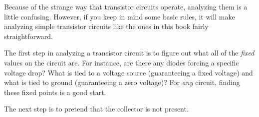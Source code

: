 Because of the strange way that transistor circuits operate, analyzing them is a little confusing.
However, if you keep in mind some basic rules, it will make analyzing simple transistor circuits like the ones in this book fairly straightforward.

The first step in analyzing a transistor circuit is to figure out what all of the \emph{fixed} values on the circuit are.
For instance, are there any diodes forcing a specific voltage drop?
What is tied to a voltage source (guaranteeing a fixed voltage) and what is tied to ground (guaranteeing a zero voltage)?
For \emph{any} circuit, finding these fixed points is a good start.

The next step is to pretend that the collector is not present.
